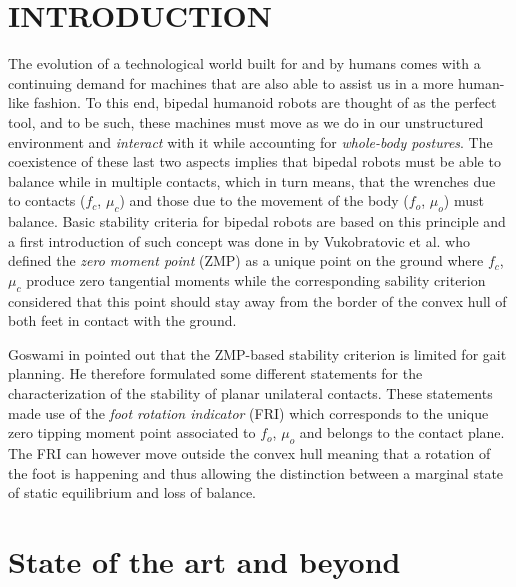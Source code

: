 \documentclass[letterpaper, 10 pt, conference]{ieeeconf}  %
\begin{document}
\section{INTRODUCTION}
The evolution of a technological world built for and by humans comes with a continuing demand for machines that are also able to assist us in a more human-like fashion. To this end, bipedal humanoid robots are thought of as the perfect tool, and to be such, these machines must move as we do in our unstructured environment and \emph{interact} with it while accounting for \emph{whole-body postures}. The coexistence of these last two aspects implies that bipedal robots must be able to balance while in multiple contacts, which in turn means, that  the wrenches due to contacts ($f_c$, $\mu_c$) and those due to the movement of the body ($f_o$, $\mu_o$) must balance. Basic stability criteria for bipedal robots are based on this principle and a first introduction of such concept was done in \cite{Vukobratovic1969} by Vukobratovic et al. who defined the \emph{zero moment point} (ZMP) as a unique point on the ground where $f_c$, $\mu_c$ produce zero tangential moments while the corresponding sability criterion considered that this point should stay away from the border of the convex hull of both feet in contact with the ground.

Goswami in \cite{Goswami1999} pointed out that the ZMP-based stability criterion is limited for gait planning. He therefore formulated some different statements for the characterization of the stability of planar unilateral contacts. These statements made use of the \emph{foot rotation indicator} (FRI) which corresponds to the unique zero tipping moment point associated to $f_o$, $\mu_o$ and belongs to the contact plane. The FRI can however move outside the convex hull meaning that a rotation of the foot is happening and thus allowing the distinction between a marginal state of static equilibrium and loss of balance. 

\section{State of the art and beyond}
\end{document}
